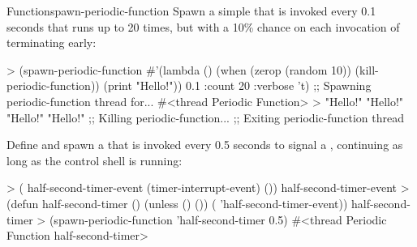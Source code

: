 \begin{functiondoc}{Function}{spawn-periodic-function}
%
Spawn a simple  that is invoked every 0.1 seconds
that runs up to 20 times, but with a 10\% chance on each invocation of
terminating early:
\begin{example}
> (spawn-periodic-function 
     #'(lambda ()
         (when (zerop (random 10))
           (kill-periodic-function))
         (print "Hello!")) 
     0.1
     :count 20
     :verbose 't)
;; Spawning periodic-function thread for...
#<thread Periodic Function>
>
"Hello!" 
"Hello!" 
"Hello!" 
"Hello!" 
;; Killing periodic-function...
;; Exiting periodic-function thread

\end{example}

%
%
%
%
Define and spawn a  that is invoked every 0.5 seconds
to signal a , continuing as long as the
control shell is running:
\begin{example}
> ( half-second-timer-event (timer-interrupt-event)
    ())
half-second-timer-event
> (defun half-second-timer ()
    (unless ()
      ())
    ( 'half-second-timer-event))
half-second-timer
> (spawn-periodic-function 'half-second-timer 0.5)
#<thread Periodic Function half-second-timer>
\end{example}

\end{functiondoc}



